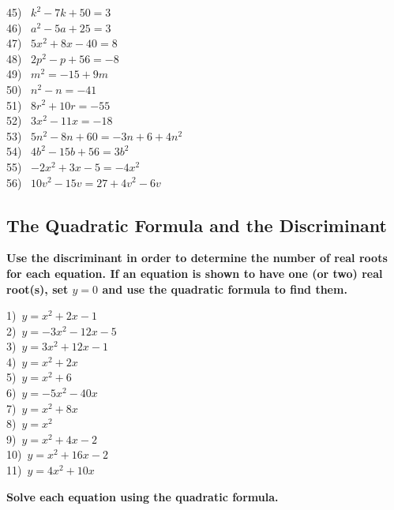 \documentclass[12pt]{book}
\theoremstyle{definition}
\begin{document}
\begin{multicols}{2}
  45)~ $k^2 - 7 k + 50 = 3$\\
  46)~ $a^2 - 5 a + 25 = 3$\\
  47)~ $5 x^2 + 8 x - 40 = 8$\\
  48)~ $2 p^2 - p + 56 = - 8$\\
  49)~ $m^2 = - 15 + 9 m$\\
  50)~ $n^2 - n = - 41$\\
  51)~ $8 r^2 + 10 r = - 55$\\
  52)~ $3 x^2 - 11 x = - 18$\\
  53)~ $5 n^2 - 8 n + 60 = - 3 n + 6 + 4 n^2$\\
  54)~ $4 b^2 - 15 b + 56 = 3 b^2$\\
  55)~ $- 2 x^2 + 3 x - 5 = - 4 x^2$\\
  56)~ $10 v^2 - 15 v = 27 + 4 v^2 - 6 v$
\end{multicols}

\subsection*{The Quadratic Formula and the Discriminant}

{\bf Use the discriminant in order to determine the number of real roots for each equation.  If an equation is shown to have one (or two) real root(s), set $y=0$ and use the quadratic formula to find them.}
\label{QF}
\begin{multicols}{3}
  1)~$y=x^2+2x-1 $\\
	2)~$y=-3x^2-12x-5 $\\
  3)~$y=3x^2+12x-1$\\
  4)~$y=x^2+2x$\\
  5)~$y=x^2+6$\\
  6)~$y=-5x^2-40x$\\
  7)~$y=x^2+8x$\\
  8)~$y=x^2$\\
  9)~$y=x^2+4x-2$\\
  10)~$y=x^2+16x-2$\\
  11)~$y=4x^2+10x$
\end{multicols}

{\bf Solve each equation using the quadratic formula.}
\end{document}
